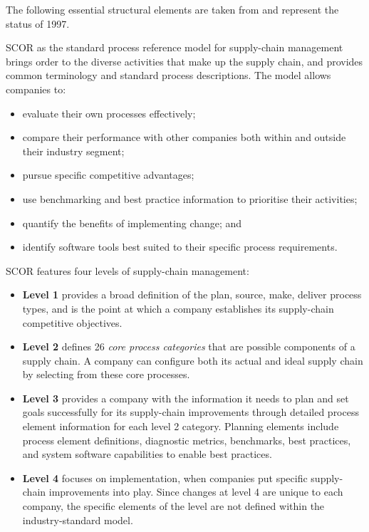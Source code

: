 \documentclass[11pt,a4paper]{article}
\begin{document}
The following essential structural elements are taken from \cite{Stewart1997}
and represent the status of 1997.

SCOR as the standard process reference model for supply-chain management
brings order to the diverse activities that make up the supply chain, and
provides common terminology and standard process descriptions. The model
allows companies to:
\begin{itemize}
\item evaluate their own processes effectively;
\item compare their performance with other companies both within and outside
  their industry segment;
\item pursue specific competitive advantages;
\item use benchmarking and best practice information to prioritise their
  activities;
\item quantify the benefits of implementing change; and
\item identify software tools best suited to their specific process
  requirements.
\end{itemize}

SCOR features four levels of supply-chain management:
\begin{itemize}
\item \textbf{Level 1} provides a broad definition of the plan, source, make,
  deliver process types, and is the point at which a company establishes its
  supply-chain competitive objectives.
\item \textbf{Level 2} defines 26 \emph{core process categories} that are
  possible components of a supply chain. A company can configure both its
  actual and ideal supply chain by selecting from these core processes.
\item \textbf{Level 3} provides a company with the information it needs to
  plan and set goals successfully for its supply-chain improvements through
  detailed process element information for each level 2 category. Planning
  elements include process element definitions, diagnostic metrics,
  benchmarks, best practices, and system software capabilities to enable best
  practices.
\item \textbf{Level 4} focuses on implementation, when companies put specific
  supply-chain improvements into play. Since changes at level 4 are unique to
  each company, the specific elements of the level are not defined within the
  industry-standard model.
\end{itemize}
\end{document}
